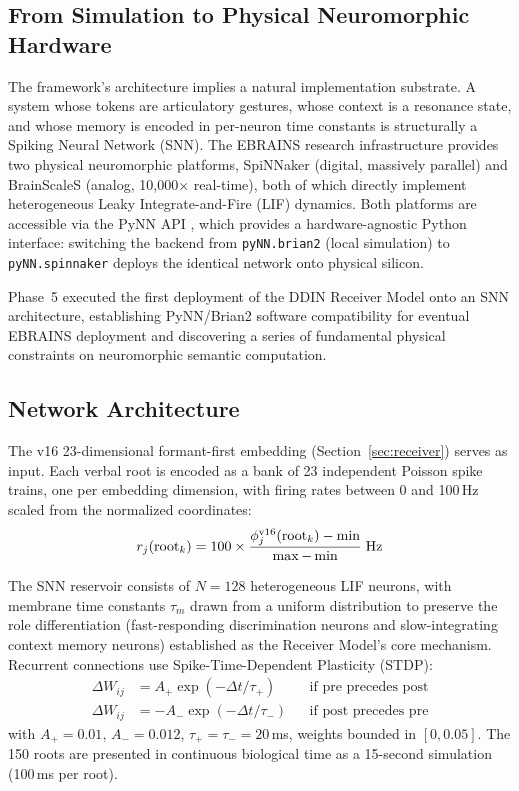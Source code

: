 \documentclass[12pt]{article}
\begin{document}
\subsection{From Simulation to Physical Neuromorphic Hardware}

The framework's architecture implies a natural implementation substrate. A system whose tokens are articulatory gestures, whose context is a resonance state, and whose memory is encoded in per-neuron time constants is structurally a Spiking Neural Network (SNN). The EBRAINS research infrastructure provides two physical neuromorphic platforms, SpiNNaker (digital, massively parallel) and BrainScaleS (analog, 10{,}000$\times$ real-time), both of which directly implement heterogeneous Leaky Integrate-and-Fire (LIF) dynamics. Both platforms are accessible via the PyNN API \cite{davison2008}, which provides a hardware-agnostic Python interface: switching the backend from \texttt{pyNN.brian2} (local simulation) to \texttt{pyNN.spinnaker} deploys the identical network onto physical silicon.

Phase~5 executed the first deployment of the DDIN Receiver Model onto an SNN architecture, establishing PyNN/Brian2 software compatibility for eventual EBRAINS deployment and discovering a series of fundamental physical constraints on neuromorphic semantic computation.

\subsection{Network Architecture}

The v16 23-dimensional formant-first embedding (Section~\ref{sec:receiver}) serves as input. Each verbal root is encoded as a bank of 23 independent Poisson spike trains, one per embedding dimension, with firing rates between 0 and 100\,Hz scaled from the normalized coordinates:
\[
r_j(\text{root}_k) = 100 \times \frac{\phi^{\rm v16}_j(\text{root}_k) - \min}{\max - \min}\;\text{Hz}
\]

The SNN reservoir consists of $N = 128$ heterogeneous LIF neurons, with membrane time constants $\tau_m$ drawn from a uniform distribution to preserve the role differentiation (fast-responding discrimination neurons and slow-integrating context memory neurons) established as the Receiver Model's core mechanism. Recurrent connections use Spike-Time-Dependent Plasticity (STDP):
\begin{align}
\Delta W_{ij} &= A_+\exp(-\Delta t/\tau_+) &&\text{if pre precedes post}\\
\Delta W_{ij} &= -A_-\exp(-\Delta t/\tau_-) &&\text{if post precedes pre}
\end{align}
with $A_+=0.01$, $A_-=0.012$, $\tau_+=\tau_-=20$\,ms, weights bounded in $[0,0.05]$. The 150 roots are presented in continuous biological time as a 15-second simulation (100\,ms per root).
\end{document}
